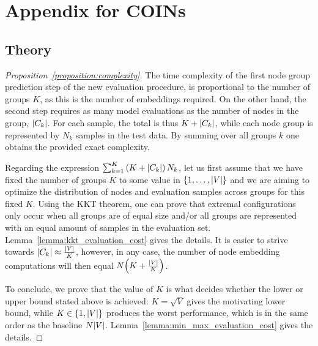 \appendix
\chapter{Appendix for COINs}

\section{Theory}
\label{sec:appendix_proofs}

\begin{proof}[Proposition~\ref{proposition:complexity}]
    The time complexity of the first node group prediction step of the new evaluation procedure, is proportional to the number of groups $K$, as this is the number of embeddings required. On the other hand, the second step requires as many model evaluations as the number of nodes in the group, $\mathopen{}\left|C_k\right|$. For each sample, the total is thus $K+\mathopen{}\left|C_k\right|$, while each node group is represented by $N_k$ samples in the test data. By summing over all groups $k$ one obtains the provided exact complexity.

    Regarding the expression $\sum_{k=1}^{K}{\mathopen{}\left(K+\mathopen{}\left|C_k\right|\right)N_k}$, let us first assume that we have fixed the number of groups $K$ to some value in $\mathopen{}\left\{1,\dots,\mathopen{}\left|V\right|\right\}$ and we are aiming to optimize the distribution of nodes and evaluation samples across groups for this fixed $K$. Using the KKT theorem, one can prove that extremal configurations only occur when all groups are of equal size and/or all groups are represented with an equal amount of samples in the evaluation set. Lemma~\ref{lemma:kkt_evaluation_cost} gives the details. It is easier to strive towards $\mathopen{}\left|C_k\right| \approx \frac{\mathopen{}\left|V\right|}{K}$, however, in any case, the number of node embedding computations will then equal $N\mathopen{}\left(K + \frac{\mathopen{}\left|V\right|}{K}\right)$. 
    
    To conclude, we prove that the value of $K$ is what decides whether the lower or upper bound stated above is achieved: $K=\sqrt{V}$ gives the motivating lower bound, while $K \in \mathopen{}\left\{1, \mathopen{}\left|V\right|\right\}$ produces the worst performance, which is in the same order as the baseline $N \mathopen{}\left|V\right|$. Lemma~\ref{lemma:min_max_evaluation_cost} gives the details.
\end{proof}

